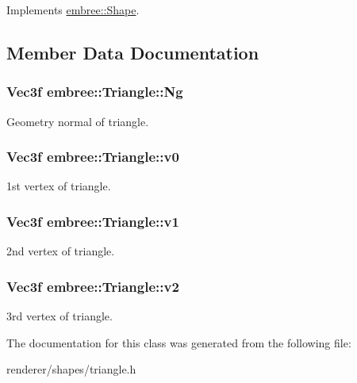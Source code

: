 Implements \hyperlink{classembree_1_1_shape_a33a3df726fed0bf3e6e36da428091305}{embree::Shape}.



\subsection{Member Data Documentation}
\hypertarget{classembree_1_1_triangle_a2754b3be98c820b91f341582e2d860e1}{
\subsubsection[{Ng}]{\setlength{\rightskip}{0pt plus 5cm}Vec3f {\bf embree::Triangle::Ng}}}
\label{classembree_1_1_triangle_a2754b3be98c820b91f341582e2d860e1}


Geometry normal of triangle. 

\hypertarget{classembree_1_1_triangle_ac196941206e28259cde3a53d85d0e2d7}{
\subsubsection[{v0}]{\setlength{\rightskip}{0pt plus 5cm}Vec3f {\bf embree::Triangle::v0}}}
\label{classembree_1_1_triangle_ac196941206e28259cde3a53d85d0e2d7}


1st vertex of triangle. 

\hypertarget{classembree_1_1_triangle_afa24c04d894b0ef9fda12873ac5aa12f}{
\subsubsection[{v1}]{\setlength{\rightskip}{0pt plus 5cm}Vec3f {\bf embree::Triangle::v1}}}
\label{classembree_1_1_triangle_afa24c04d894b0ef9fda12873ac5aa12f}


2nd vertex of triangle. 

\hypertarget{classembree_1_1_triangle_a8637eb32ee174a4466d8ba4bfee81ee1}{
\subsubsection[{v2}]{\setlength{\rightskip}{0pt plus 5cm}Vec3f {\bf embree::Triangle::v2}}}
\label{classembree_1_1_triangle_a8637eb32ee174a4466d8ba4bfee81ee1}


3rd vertex of triangle. 



The documentation for this class was generated from the following file:\begin{DoxyCompactItemize}
\item 
renderer/shapes/triangle.h\end{DoxyCompactItemize}
